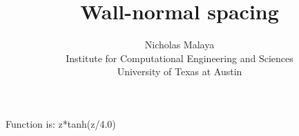 \documentclass{article}
\title{\bf{Wall-normal spacing}}
\author{Nicholas Malaya \\ Institute for Computational Engineering and Sciences \\ University of Texas at Austin} \date{}
\begin{document}
\maketitle

Function is: 
z*tanh(z/4.0)
\end{document}

